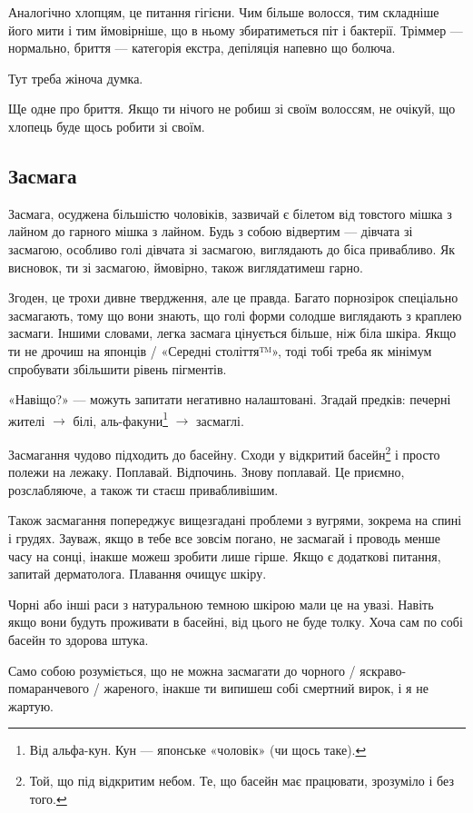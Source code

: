 Аналогічно хлопцям, це питання гігієни. Чим більше волосся, тим складніше його
мити і тим ймовірніше, що в ньому збиратиметься піт і бактерії. Тріммер —
нормально, бриття — категорія екстра, депіляція напевно що болюча.

Тут треба жіноча думка.

Ще одне про бриття. Якщо ти нічого не робиш зі своїм волоссям, не очікуй, що
хлопець буде щось робити зі своїм.

\subsection{Засмага}
Засмага, осуджена більшістю чоловіків, зазвичай є білетом від товстого
мішка з лайном до гарного мішка з лайном. Будь з собою відвертим — дівчата
зі засмагою, особливо голі дівчата зі засмагою, виглядають до біса привабливо.
Як висновок, ти зі засмагою, ймовірно, також виглядатимеш гарно.

Згоден, це трохи дивне твердження, але це правда. Багато порнозірок спеціально
засмагають, тому що вони знають, що голі форми солодше виглядають з краплею
засмаги. Іншими словами, легка засмага цінується більше, ніж біла шкіра. Якщо
ти не дрочиш на японців / «Середні століття™», тоді тобі треба як мінімум
спробувати збільшити рівень пігментів.

«Навіщо?» — можуть запитати негативно налаштовані. Згадай предків: печерні
жителі $\rightarrow$ білі, аль-факуни\footnote{Від альфа-кун. Кун — японське
«чоловік» (чи щось таке).} $\rightarrow$ засмаглі.

Засмагання чудово підходить до басейну. Сходи у відкритий басейн\footnote{Той,
що під відкритим небом. Те, що басейн має працювати, зрозуміло і без того.} і
просто полежи на лежаку. Поплавай. Відпочинь. Знову поплавай. Це приємно,
розслабляюче, а також ти стаєш привабливішим.

Також засмагання попереджує вищезгадані проблеми з вугрями, зокрема на спині
і грудях. Зауваж, якщо в тебе все зовсім погано, не засмагай і проводь менше
часу на сонці, інакше можеш зробити лише гірше. Якщо є додаткові питання,
запитай дерматолога. Плавання очищує шкіру.

Чорні або інші раси з натуральною темною шкірою мали це на увазі. Навіть якщо
вони будуть проживати в басейні, від цього не буде толку. Хоча сам по собі
басейн то здорова штука.

Само собою розуміється, що не можна засмагати до чорного / яскраво-
помаранчевого / жареного, інакше ти випишеш собі смертний вирок, і я не жартую.

